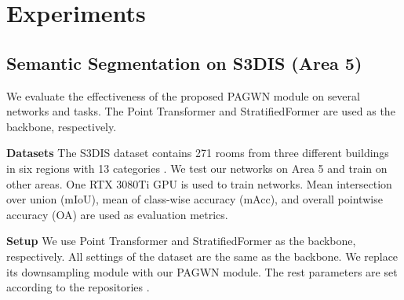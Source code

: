 \documentclass[10pt,twocolumn,letterpaper]{article}
\begin{document}
\section{Experiments}
    \subsection{Semantic Segmentation on S3DIS (Area 5)}
        We evaluate the effectiveness of the proposed PAGWN module on several networks and tasks. The Point Transformer \cite{24Zhao_2021} and StratifiedFormer \cite{44qq} are used as the backbone, respectively.

        \textbf{Datasets}  The S3DIS dataset contains 271 rooms from three different buildings in six regions with 13 categories \cite{48Armeni_2016}. We test our networks on Area 5 and train on other areas. One RTX 3080Ti GPU is used to train networks. Mean intersection over union (mIoU), mean of class-wise accuracy (mAcc), and overall pointwise accuracy (OA) are used as evaluation metrics.

        \textbf{Setup}  We use Point Transformer and StratifiedFormer as the backbone, respectively. All settings of the dataset are the same as the backbone. We replace its downsampling module with our PAGWN module. The rest parameters are set according to the repositories \cite{46,47}.
\end{document}
